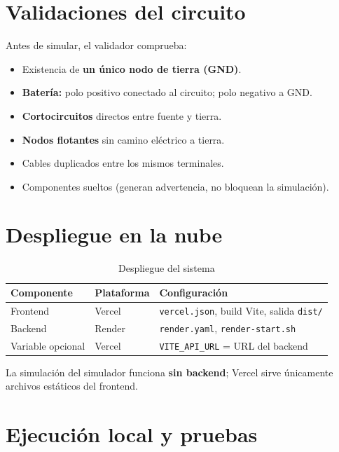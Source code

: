\documentclass[12pt,a4paper]{article}
\begin{document}
\section{Validaciones del circuito}

Antes de simular, el validador comprueba:

\begin{itemize}
  \item Existencia de \textbf{un único nodo de tierra (GND)}.
  \item \textbf{Batería:} polo positivo conectado al circuito; polo negativo a GND.
  \item \textbf{Cortocircuitos} directos entre fuente y tierra.
  \item \textbf{Nodos flotantes} sin camino eléctrico a tierra.
  \item Cables duplicados entre los mismos terminales.
  \item Componentes sueltos (generan advertencia, no bloquean la simulación).
\end{itemize}

\section{Despliegue en la nube}

\begin{table}[H]
  \centering
  \begin{tabular}{lll}
    \toprule
    \textbf{Componente} & \textbf{Plataforma} & \textbf{Configuración} \\
    \midrule
    Frontend & Vercel & \texttt{vercel.json}, build Vite, salida \texttt{dist/} \\
    Backend & Render & \texttt{render.yaml}, \texttt{render-start.sh} \\
    Variable opcional & Vercel & \texttt{VITE\_API\_URL} = URL del backend \\
    \bottomrule
  \end{tabular}
  \caption{Despliegue del sistema}
\end{table}

La simulación del simulador funciona \textbf{sin backend}; Vercel sirve únicamente archivos estáticos del frontend.

\section{Ejecución local y pruebas}
\end{document}
